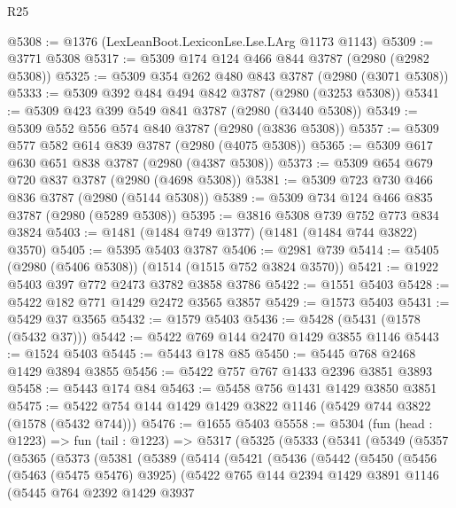 \begin{lexlean}{R25}
\begin{coremodule}
@5308 := @1376 (LexLeanBoot.LexiconLse.Lse.LArg @1173 @1143)
@5309 := @3771 @5308
@5317 := @5309 @174 @124 @466 @844 @3787 (@2980 (@2982 @5308))
@5325 := @5309 @354 @262 @480 @843 @3787 (@2980 (@3071 @5308))
@5333 := @5309 @392 @484 @494 @842 @3787 (@2980 (@3253 @5308))
@5341 := @5309 @423 @399 @549 @841 @3787 (@2980 (@3440 @5308))
@5349 := @5309 @552 @556 @574 @840 @3787 (@2980 (@3836 @5308))
@5357 := @5309 @577 @582 @614 @839 @3787 (@2980 (@4075 @5308))
@5365 := @5309 @617 @630 @651 @838 @3787 (@2980 (@4387 @5308))
@5373 := @5309 @654 @679 @720 @837 @3787 (@2980 (@4698 @5308))
@5381 := @5309 @723 @730 @466 @836 @3787 (@2980 (@5144 @5308))
@5389 := @5309 @734 @124 @466 @835 @3787 (@2980 (@5289 @5308))
@5395 := @3816 @5308 @739 @752 @773 @834 @3824
@5403 := @1481 (@1484 @749 @1377) (@1481 (@1484 @744 @3822) @3570)
@5405 := @5395 @5403 @3787
@5406 := @2981 @739
@5414 := @5405 (@2980 (@5406 @5308)) (@1514 (@1515 @752 @3824 @3570))
@5421 := @1922 @5403 @397 @772 @2473 @3782 @3858 @3786
@5422 := @1551 @5403
@5428 := @5422 @182 @771 @1429 @2472 @3565 @3857
@5429 := @1573 @5403
@5431 := @5429 @37 @3565
@5432 := @1579 @5403
@5436 := @5428 (@5431 (@1578 (@5432 @37)))
@5442 := @5422 @769 @144 @2470 @1429 @3855 @1146
@5443 := @1524 @5403
@5445 := @5443 @178 @85
@5450 := @5445 @768 @2468 @1429 @3894 @3855
@5456 := @5422 @757 @767 @1433 @2396 @3851 @3893
@5458 := @5443 @174 @84
@5463 := @5458 @756 @1431 @1429 @3850 @3851
@5475 := @5422 @754 @144 @1429 @1429 @3822 @1146 (@5429 @744 @3822 (@1578 (@5432 @744)))
@5476 := @1655 @5403
@5558 := @5304
    (fun (head : @1223) =>
    fun (tail : @1223) =>
    @5317
      (@5325
        (@5333
          (@5341
            (@5349
              (@5357
                (@5365
                  (@5373
                    (@5381
                      (@5389
                        (@5414
                          (@5421
                            (@5436
                              (@5442
                                (@5450
                                  (@5456
                                    (@5463 (@5475 @5476) @3925)
                                    (@5422
                                      @765
                                      @144
                                      @2394
                                      @1429
                                      @3891
                                      @1146
                                      (@5445
                                        @764
                                        @2392
                                        @1429
                                        @3937

\end{coremodule}
\end{lexlean}
